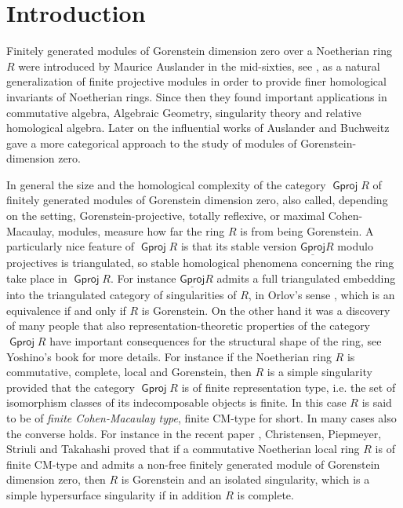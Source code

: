 \documentclass[oneside, a4paper,reqno]{amsart}
\numberwithin{equation}{section}
\theoremstyle{definition}
\begin{document}
\setcounter{tocdepth}{1} \tableofcontents

\section{Introduction}
Finitely generated modules of Gorenstein dimension zero over a
Noetherian ring $R$ were introduced by Maurice Auslander in the
mid-sixties, see \cite{Auslander:ENS, ABr}, as a natural
generalization of finite projective modules in order to provide
finer homological invariants of Noetherian rings. Since then they
found important applications in commutative algebra, Algebraic
Geometry, singularity theory and relative homological algebra. Later
on the influential works of Auslander and Buchweitz \cite{ABu,
Buchweitz:tate} gave a more categorical approach to the study of
modules of Gorenstein-dimension zero.

 In general the size and the homological
complexity of the category ${\operatorname{\mathsf{Gproj}}\nolimits} R$ of finitely generated modules
of Gorenstein dimension zero, also called, depending on the setting,
Gorenstein-projective, totally reflexive, or maximal Cohen-Macaulay,
modules, measure how far the ring $R$ is from being Gorenstein. A
particularly  nice feature of ${\operatorname{\mathsf{Gproj}}\nolimits} R$ is that its stable version
${\operatorname{\underline{\mathsf{Gproj}}}\nolimits} R$ modulo projectives is triangulated, so stable
homological phenomena concerning the ring take place in ${\operatorname{\mathsf{Gproj}}\nolimits} R$. For instance ${\operatorname{\underline{\mathsf{Gproj}}}\nolimits} R$
admits a full triangulated embedding into the triangulated category of singularities of $R$, in Orlov's sense \cite{Orlov}, which is an equivalence if and only if $R$ is Gorenstein.
On the other hand it was a discovery of many people that also
representation-theoretic properties of the category ${\operatorname{\mathsf{Gproj}}\nolimits} R$ have
important consequences for the structural shape of the ring, see
Yoshino's book \cite{Yoshino:book} for more details.  For instance
if the Noetherian ring $R$ is commutative, complete, local and
Gorenstein, then $R$ is a simple singularity provided that the
category ${\operatorname{\mathsf{Gproj}}\nolimits} R$ is of finite representation type, i.e. the set
of isomorphism classes of its indecomposable objects is finite. In
this case  $R$ is said to be of {\em finite Cohen-Macaulay type},
finite CM-type for short.  In many cases also the converse holds.
For instance in the recent paper \cite{CPST}, Christensen,
Piepmeyer, Striuli and Takahashi proved that if a commutative
Noetherian local ring $R$ is of finite CM-type and admits a non-free
finitely generated module of Gorenstein dimension zero, then $R$ is
Gorenstein and an isolated singularity, which is  a simple hypersurface singularity if in addition $R$ is
complete.
\end{document}
